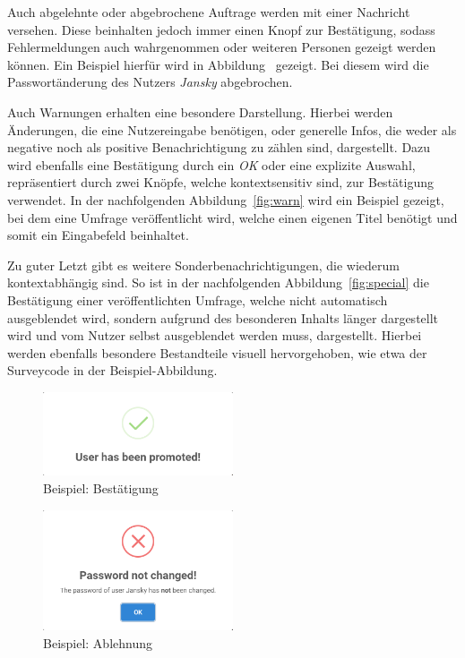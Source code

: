 Auch abgelehnte oder abgebrochene Auftrage werden mit einer Nachricht versehen.
Diese beinhalten jedoch immer einen Knopf zur Bestätigung, sodass Fehlermeldungen auch wahrgenommen oder weiteren Personen gezeigt werden können.
Ein Beispiel hierfür wird in Abbildung~ gezeigt.
Bei diesem wird die Passwortänderung des Nutzers \emph{Jansky} abgebrochen.

Auch Warnungen erhalten eine besondere Darstellung.
Hierbei werden Änderungen, die eine Nutzereingabe benötigen, oder generelle Infos, die weder als negative noch als positive Benachrichtigung zu zählen sind, dargestellt.
Dazu wird ebenfalls eine Bestätigung durch ein \emph{OK} oder eine explizite Auswahl, repräsentiert durch zwei Knöpfe, welche kontextsensitiv sind, zur Bestätigung verwendet.
In der nachfolgenden Abbildung~\ref{fig:warn} wird ein Beispiel gezeigt, bei dem eine Umfrage veröffentlicht wird, welche einen eigenen Titel benötigt und somit ein Eingabefeld beinhaltet.

Zu guter Letzt gibt es weitere Sonderbenachrichtigungen, die wiederum kontextabhängig sind.
So ist in der nachfolgenden Abbildung~\ref{fig:special} die Bestätigung einer veröffentlichten Umfrage, welche nicht automatisch ausgeblendet wird, sondern aufgrund des besonderen Inhalts länger dargestellt wird und vom Nutzer selbst ausgeblendet werden muss, dargestellt.
Hierbei werden ebenfalls besondere Bestandteile visuell hervorgehoben, wie etwa der Surveycode in der Beispiel-Abbildung.

\begin{figure}[H]
	\centering
	\includegraphics[width=0.5\textwidth, keepaspectratio]{img/guide/Angenommen.png}
	\captionsetup{justification=centering, format=plain}
	\caption[Meldung: Bestätigung]{Beispiel: Bestätigung \\\quelleScreenshot}
	\label{fig:approve}
\end{figure}

\begin{figure}[H]
	\centering
	\includegraphics[width=0.5\textwidth, keepaspectratio]{img/guide/Abgelehnt.png}
	\captionsetup{justification=centering, format=plain}
	\caption[Meldung: Ablehnung]{Beispiel: Ablehnung \\\quelleScreenshot}
	\label{fig:deny}
\end{figure}

